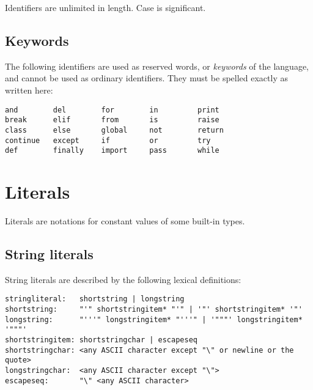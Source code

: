 Identifiers are unlimited in length.  Case is significant.

\subsection{Keywords}

The following identifiers are used as reserved words, or {\em
keywords} of the language, and cannot be used as ordinary
identifiers.  They must be spelled exactly as written here:

\begin{verbatim}
and        del        for        in         print
break      elif       from       is         raise
class      else       global     not        return
continue   except     if         or         try
def        finally    import     pass       while
\end{verbatim}


\section{Literals} \label{literals}

Literals are notations for constant values of some built-in types.

\subsection{String literals}

String literals are described by the following lexical definitions:

\begin{verbatim}
stringliteral:   shortstring | longstring
shortstring:     "'" shortstringitem* "'" | '"' shortstringitem* '"'
longstring:      "'''" longstringitem* "'''" | '"""' longstringitem* '"""'
shortstringitem: shortstringchar | escapeseq
shortstringchar: <any ASCII character except "\" or newline or the quote>
longstringchar:  <any ASCII character except "\">
escapeseq:       "\" <any ASCII character>
\end{verbatim}


